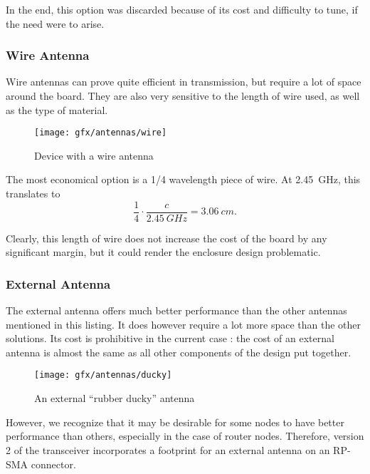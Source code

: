 In the end, this option was discarded because of its cost and difficulty to
tune, if the need were to arise.

\subsubsection{Wire Antenna}

Wire antennas can prove quite efficient in transmission, but require a lot of
space around the board. They are also very sensitive to the length of wire
used, as well as the type of material. 

\begin{figure}[bth]
  \begin{center}
    \texttt{[image: gfx/antennas/wire]}
  \end{center}
  \caption{Device with a wire antenna}
  \label{fig:wire-antenna}
\end{figure}

The most economical option is a 1/4 wavelength piece of wire\citep{slyt296}. At
\SI{2.45}{GHz}, this translates to
\begin{equation*}
  \frac{1}{4} \cdot \frac{c}{\SI{2.45}{GHz}} = \SI{3.06}{cm}.
  \label{eq:wavelength}
\end{equation*}

Clearly, this length of wire does not increase the cost of the board by any
significant margin, but it could render the enclosure design problematic.

\subsubsection{External Antenna}

The external antenna offers much better performance than the other antennas
mentioned in this listing. It does however require a lot more space than the
other solutions. Its cost is prohibitive in the current case : the cost of an
external antenna is almost the same as all other components of the design put
together.

\begin{figure}[bth]
  \begin{center}
    \texttt{[image: gfx/antennas/ducky]}
  \end{center}
  \caption{An external ``rubber ducky'' antenna}
  \label{fig:ducky-antenna}
\end{figure}

However, we recognize that it may be desirable for some nodes to have better
performance than others, especially in the case of router nodes. Therefore,
version 2 of the transceiver incorporates a footprint for an external antenna on
an RP-SMA connector.


